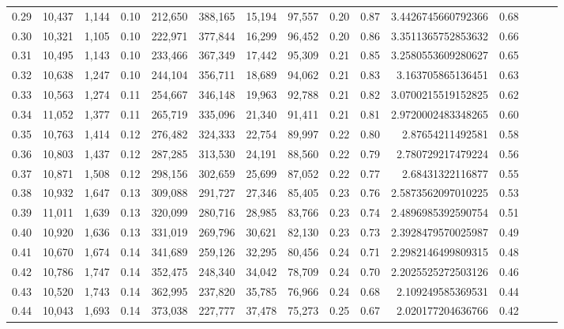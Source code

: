 \begin{tabular}{rrrrrrrrrrrrrrr}
0.29 &  10,437 &  1,144 &  0.10 &  212,650 &  388,165 &   15,194 &   97,557 &  0.20 &  0.87 &    3.4426745660792366 &      0.68 \\
0.30 &  10,321 &  1,105 &  0.10 &  222,971 &  377,844 &   16,299 &   96,452 &  0.20 &  0.86 &    3.3511365752853632 &      0.66 \\
0.31 &  10,495 &  1,143 &  0.10 &  233,466 &  367,349 &   17,442 &   95,309 &  0.21 &  0.85 &    3.2580553609280627 &      0.65 \\
0.32 &  10,638 &  1,247 &  0.10 &  244,104 &  356,711 &   18,689 &   94,062 &  0.21 &  0.83 &     3.163705865136451 &      0.63 \\
0.33 &  10,563 &  1,274 &  0.11 &  254,667 &  346,148 &   19,963 &   92,788 &  0.21 &  0.82 &    3.0700215519152825 &      0.62 \\
0.34 &  11,052 &  1,377 &  0.11 &  265,719 &  335,096 &   21,340 &   91,411 &  0.21 &  0.81 &    2.9720002483348265 &      0.60 \\
0.35 &  10,763 &  1,414 &  0.12 &  276,482 &  324,333 &   22,754 &   89,997 &  0.22 &  0.80 &      2.87654211492581 &      0.58 \\
0.36 &  10,803 &  1,437 &  0.12 &  287,285 &  313,530 &   24,191 &   88,560 &  0.22 &  0.79 &     2.780729217479224 &      0.56 \\
0.37 &  10,871 &  1,508 &  0.12 &  298,156 &  302,659 &   25,699 &   87,052 &  0.22 &  0.77 &      2.68431322116877 &      0.55 \\
0.38 &  10,932 &  1,647 &  0.13 &  309,088 &  291,727 &   27,346 &   85,405 &  0.23 &  0.76 &    2.5873562097010225 &      0.53 \\
0.39 &  11,011 &  1,639 &  0.13 &  320,099 &  280,716 &   28,985 &   83,766 &  0.23 &  0.74 &    2.4896985392590754 &      0.51 \\
0.40 &  10,920 &  1,636 &  0.13 &  331,019 &  269,796 &   30,621 &   82,130 &  0.23 &  0.73 &    2.3928479570025987 &      0.49 \\
0.41 &  10,670 &  1,674 &  0.14 &  341,689 &  259,126 &   32,295 &   80,456 &  0.24 &  0.71 &    2.2982146499809315 &      0.48 \\
0.42 &  10,786 &  1,747 &  0.14 &  352,475 &  248,340 &   34,042 &   78,709 &  0.24 &  0.70 &    2.2025525272503126 &      0.46 \\
0.43 &  10,520 &  1,743 &  0.14 &  362,995 &  237,820 &   35,785 &   76,966 &  0.24 &  0.68 &     2.109249585369531 &      0.44 \\
0.44 &  10,043 &  1,693 &  0.14 &  373,038 &  227,777 &   37,478 &   75,273 &  0.25 &  0.67 &     2.020177204636766 &      0.42 \\

\end{tabular}
